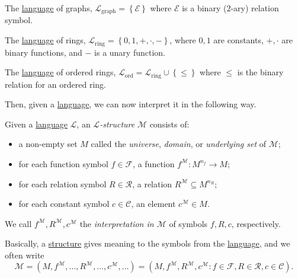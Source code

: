 \begin{eg}[Graph]\label{eg:language-graph}
	The \hyperref[def:language]{language} of graphs, \(\mathcal{L} _{\text{graph} } = \left\{ \mathcal{E} \right\}\) where \(\mathcal{E} \) is a binary (\(2\)-ary) relation symbol.
\end{eg}

\begin{eg}[Ring]\label{eg:language-ring}
	The \hyperref[def:language]{language} of rings, \(\mathcal{L} _{\text{ring} } = \left\{ 0, 1, +, \cdot, - \right\} \), where \(0, 1\) are constants, \(+, \cdot\) are binary functions, and \(-\) is a unary function.
\end{eg}

\begin{eg}\label{eg:language-ring}
	The \hyperref[def:language]{language} of ordered rings, \(\mathcal{L} _{\text{ord} } = \mathcal{L} _{\text{ring} } \cup \left\{ \leq \right\} \) where \(\leq \) is the binary relation for an ordered ring.
\end{eg}

Then, given a \hyperref[def:language]{language}, we can now interpret it in the following way.

\begin{definition}[Structure]\label{def:structure}
	Given a \hyperref[def:language]{language} \(\mathcal{L} \), an \emph{\(\mathcal{L} \)-structure} \(\mathcal{M} \) consists of:
	\begin{itemize}
		\item a non-empty set \(M\) called the \emph{universe}, \emph{domain}, or \emph{underlying set} of \(\mathcal{M} \);
		\item for each function symbol \(f\in \mathcal{F} \), a function \(f^{\mathcal{M} } \colon M^{n_f} \to M\);
		\item for each relation symbol \(R\in \mathcal{R} \), a relation \(R^{\mathcal{M} } \subseteq M^{n_R}\);
		\item for each constant symbol \(c\in \mathcal{C} \), an element \(c^{\mathcal{M} }\in M\).
	\end{itemize}
\end{definition}

\begin{note}[Interpretation]
	We call \(f^{\mathcal{M} }, R^{\mathcal{M} }, c^{\mathcal{M} }\) the \emph{interpretation in \(\mathcal{M} \)} of symbols \(f, R, c\), respectively.
\end{note}

Basically, a \hyperref[def:structure]{structure} gives meaning to the symbols from the \hyperref[def:language]{language}, and we often write
\[
	\mathcal{M}
	= (M, f^{\mathcal{M} }, \ldots , R^{\mathcal{M} }, \ldots , c^{\mathcal{M} }, \ldots)
	= (M, f^{\mathcal{M} }, R^{\mathcal{M} }, c^{\mathcal{M} } \colon f\in \mathcal{F} , R\in \mathcal{R} , c\in \mathcal{C} ).
\]


